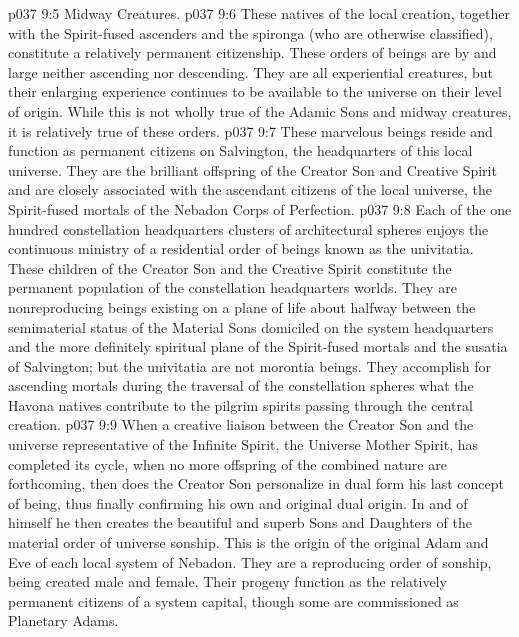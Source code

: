 \vs p037 9:5 \bibnobreakspace Midway Creatures.
\pc \vs p037 9:6 These natives of the local creation, together with the Spirit\hyp{}fused ascenders and the spironga (who are otherwise classified), constitute a relatively permanent citizenship. These orders of beings are by and large neither ascending nor descending. They are all experiential creatures, but their enlarging experience continues to be available to the universe on their level of origin. While this is not wholly true of the Adamic Sons and midway creatures, it is relatively true of these orders.
\pc \vs p037 9:7  These marvelous beings reside and function as permanent citizens on Salvington, the headquarters of this local universe. They are the brilliant offspring of the Creator Son and Creative Spirit and are closely associated with the ascendant citizens of the local universe, the Spirit\hyp{}fused mortals of the Nebadon Corps of Perfection.
\pc \vs p037 9:8  Each of the one hundred constellation headquarters clusters of architectural spheres enjoys the continuous ministry of a residential order of beings known as the univitatia. These children of the Creator Son and the Creative Spirit constitute the permanent population of the constellation headquarters worlds. They are nonreproducing beings existing on a plane of life about halfway between the semimaterial status of the Material Sons domiciled on the system headquarters and the more definitely spiritual plane of the Spirit\hyp{}fused mortals and the susatia of Salvington; but the univitatia are not morontia beings. They accomplish for ascending mortals during the traversal of the constellation spheres what the Havona natives contribute to the pilgrim spirits passing through the central creation.
\pc \vs p037 9:9  When a creative liaison between the Creator Son and the universe representative of the Infinite Spirit, the Universe Mother Spirit, has completed its cycle, when no more offspring of the combined nature are forthcoming, then does the Creator Son personalize in dual form his last concept of being, thus finally confirming his own and original dual origin. In and of himself he then creates the beautiful and superb Sons and Daughters of the material order of universe sonship. This is the origin of the original Adam and Eve of each local system of Nebadon. They are a reproducing order of sonship, being created male and female. Their progeny function as the relatively permanent citizens of a system capital, though some are commissioned as Planetary Adams.
